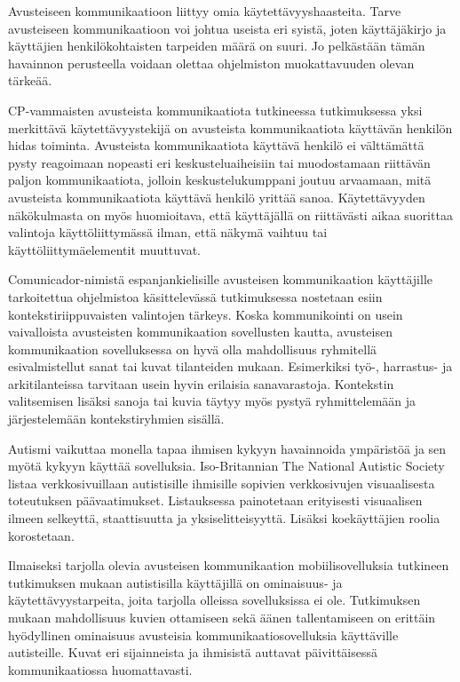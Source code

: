 \documentclass[utf8]{gradu3}
\begin{document}
Avusteiseen kommunikaatioon liittyy omia käytettävyyshaasteita. Tarve avusteiseen kommunikaatioon voi johtua useista eri syistä, joten käyttäjäkirjo ja käyttäjien henkilökohtaisten tarpeiden määrä on suuri. Jo pelkästään tämän havainnon perusteella voidaan olettaa ohjelmiston muokattavuuden olevan tärkeää.

CP-vammaisten avusteista kommunikaatiota tutkineessa tutkimuksessa \parencite[]{classmate-aac-study} yksi merkittävä käytettävyystekijä on avusteista kommunikaatiota käyttävän henkilön hidas toiminta. Avusteista kommunikaatiota käyttävä henkilö ei välttämättä pysty reagoimaan nopeasti eri keskusteluaiheisiin tai muodostamaan riittävän paljon kommunikaatiota, jolloin keskustelukumppani joutuu arvaamaan, mitä avusteista kommunikaatiota käyttävä henkilö yrittää sanoa. Käytettävyyden näkökulmasta on myös huomioitava, että käyttäjällä on riittävästi aikaa suorittaa valintoja käyttöliittymässä ilman, että näkymä vaihtuu tai käyttöliittymäelementit muuttuvat.

\label{AAC-context-settings}
Comunicador-nimistä espanjankielisille avusteisen kommunikaation käyttäjille tarkoitettua ohjelmistoa käsittelevässä tutkimuksessa \parencite[]{graphic-communicator} nostetaan esiin kontekstiriippuvaisten valintojen tärkeys. Koska kommunikointi on usein vaivalloista avusteisten kommunikaation sovellusten kautta, avusteisen kommunikaation sovelluksessa on hyvä olla mahdollisuus ryhmitellä esivalmistellut sanat tai kuvat tilanteiden mukaan. Esimerkiksi työ-, harrastus- ja arkitilanteissa tarvitaan usein hyvin erilaisia sanavarastoja. Kontekstin valitsemisen lisäksi sanoja tai kuvia täytyy myös pystyä ryhmittelemään ja järjestelemään kontekstiryhmien sisällä.

\label{AAC-staticity}
Autismi vaikuttaa monella tapaa ihmisen kykyyn havainnoida ympäristöä ja sen myötä kykyyn käyttää sovelluksia. Iso-Britannian The National Autistic Society listaa verkkosivuillaan \parencite[]{autism-friendly-websites} autistisille ihmisille sopivien verkkosivujen visuaalisesta toteutuksen päävaatimukset. Listauksessa painotetaan erityisesti visuaalisen ilmeen selkeyttä, staattisuutta ja yksiselitteisyyttä. Lisäksi koekäyttäjien roolia korostetaan.

Ilmaiseksi tarjolla olevia avusteisen kommunikaation mobiilisovelluksia tutkineen tutkimuksen \parencite[]{autism-mobile-usability} mukaan autistisilla käyttäjillä on ominaisuus- ja käytettävyystarpeita, joita tarjolla olleissa sovelluksissa ei ole. Tutkimuksen mukaan mahdollisuus kuvien ottamiseen sekä äänen tallentamiseen on erittäin hyödyllinen ominaisuus avusteisia kommunikaatiosovelluksia käyttäville autisteille. Kuvat eri sijainneista ja ihmisistä auttavat päivittäisessä kommunikaatiossa huomattavasti. \label{AAC-photos}
\end{document}
